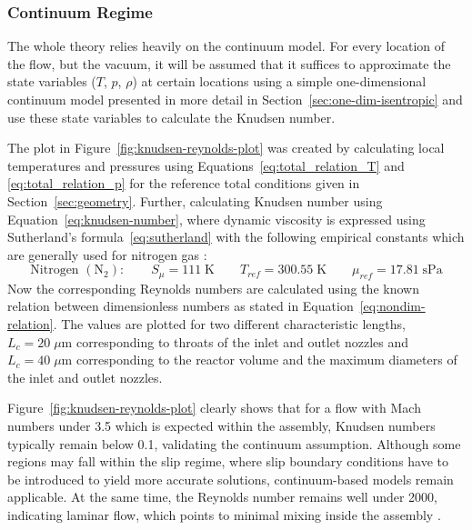 \subsubsection*{Continuum Regime}
	The whole theory relies heavily on the continuum model.
	For every location of the flow, but the vacuum, it will be assumed that it suffices to approximate the state variables ($T$, $p$, $\rho$) at certain locations using a simple one-dimensional continuum model presented in more detail in Section~\ref{sec:one-dim-isentropic} and use these state variables to calculate the Knudsen number.

	The plot in Figure~\ref{fig:knudsen-reynolds-plot} was created by calculating local temperatures and pressures using Equations~\eqref{eq:total_relation_T} and \eqref{eq:total_relation_p} for the reference total conditions given in Section~\ref{sec:geometry}.
	Further, calculating Knudsen number using Equation~\eqref{eq:knudsen-number}, where dynamic viscosity is expressed using Sutherland's formula~\eqref{eq:sutherland} with the following empirical constants which are generally used for nitrogen gas \cite{kim2004numericalanalysisflowcharacteristics}:
	$$
		\text{Nitrogen }(\text{N}_2):
			\qquad
		S_\mu = 111\;\text{K}
			\qquad
		T_{ref} = 300.55\;\text{K}
			\qquad
		\mu_{ref} = 17.81\; \text{sPa}
	$$
	Now the corresponding Reynolds numbers are calculated using the known relation between dimensionless numbers as stated in Equation~\eqref{eq:nondim-relation}.
	The values are plotted for two different characteristic lengths, $L_c = 20\;\mu \text{m}$ corresponding to throats of the inlet and outlet nozzles and $L_c = 40\;\mu \text{m}$ corresponding to the reactor volume and the maximum diameters of the inlet and outlet nozzles.

	Figure~\ref{fig:knudsen-reynolds-plot} clearly shows that for a flow with Mach numbers under 3.5 which is expected within the assembly, Knudsen numbers typically remain below 0.1, validating the continuum assumption.
	Although some regions may fall within the slip regime, where slip boundary conditions have to be introduced to yield more accurate solutions, continuum-based models remain applicable. 
	At the same time, the Reynolds number remains well under 2000, indicating laminar flow, which points to minimal mixing inside the assembly \cite{ames1953compressible, comsol_microfluidics_guide}.
	\newpage

